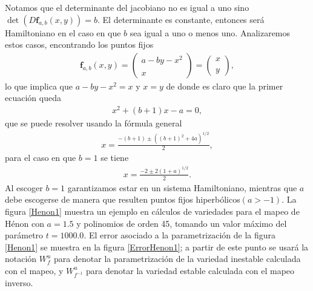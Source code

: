                 
Notamos que el determinante del jacobiano no es igual a uno sino $\det(D\mathbf{f}_{a,b}(x,y))=b$.
El determinante es constante, entonces será Hamiltoniano en el caso en que $b$ sea igual a uno o menos uno. Analizaremos estos casos, encontrando los puntos fijos
\begin{eqnarray}
\mathbf{f}_{a,b}(x,y)=\left( \begin{array}{lcc}
               a-by-x^{2}\\
               \\ x
               \end{array}
               \right) = \left(\begin{array}{lc}
               x \\
               \\ y
               \end{array}
               \right),
\end{eqnarray}        
lo que implica que $a-by-x^{2}=x$ y $x=y$ de donde es claro que la primer ecuación queda
\begin{eqnarray*}
x^{2}+(b+1)x-a=0, 
\end{eqnarray*}
que se puede resolver usando la fórmula general
\begin{eqnarray*}
x=\frac{-(b+1)\pm ((b+1)^{2}+4a)^{1/2} }{2},
\end{eqnarray*}
para el caso en que $b=1$ se tiene
\begin{eqnarray}
x=\frac{-2\pm 2(1+a)^{1/2} }{2}.
\end{eqnarray}
Al escoger $b=1$ garantizamos estar en un sistema Hamiltoniano, mientras que $a$ debe escogerse de manera que resulten puntos fijos hiperbólicos$(a>-1)$. La figura \ref{Henon1} muestra un ejemplo en cálculos de variedades para el mapeo de Hénon con $a=1.5$ y polinomios de orden 45, tomando un valor máximo del parámetro $t=1000.0$. El error asociado a la parametrización de la figura \ref{Henon1} se muestra en la figura \ref{ErrorHenon1}; a partir de este punto se usará la notación $W_{f}^{u}$ para denotar la parametrización de la variedad inestable calculada con el mapeo, y $W_{f^{-1}}^{u}$ para denotar la variedad estable calculada con el mapeo inverso.

